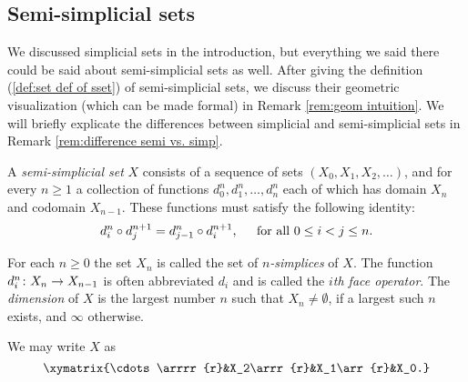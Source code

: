 \documentclass{amsart}
\begin{document}
\subsection{Semi-simplicial sets}\label{subsec:semi}

We discussed simplicial sets in the introduction, but everything we said there could be said about semi-simplicial sets as well.  After giving the definition (\ref{def:set def of sset}) of semi-simplicial sets, we discuss their geometric visualization (which can be made formal) in Remark \ref{rem:geom intuition}.  We will briefly explicate the differences between simplicial and semi-simplicial sets in Remark \ref{rem:difference semi vs. simp}.  

\begin{definition}\label{def:set def of sset}

A {\em semi-simplicial set} $X$ consists of a sequence of sets $(X_0,X_1,X_2,\ldots)$, and for every $n\geq 1$ a collection of functions $d^n_0,d^n_1,\ldots,d^n_n$ each of which has domain $X_n$ and codomain $X_{n-1}$.  These functions must satisfy the following identity: \begin{align}\label{dia:semi identity} d^n_i\circ d^{n+1}_j=d^n_{j-1}\circ d^{n+1}_i, \hspace{.2in} \textnormal{for all } 0\leq i<j\leq n.\end{align}  

For each $n\geq 0$ the set $X_n$ is called the set of {\em $n$-simplices} of $X$.  The function $d^n_i\colon X_n\rightarrow X_{n-1}$ is often abbreviated $d_i$ and is called the {\em $i$th face operator}.  The {\em dimension} of $X$ is the largest number $n$ such that $X_n\neq\emptyset$, if a largest such $n$ exists, and $\infty$ otherwise.

We may write $X$ as $$\xymatrix{\cdots \arrrr{r}&X_2\arrr{r}&X_1\arr{r}&X_0.}$$

\end{definition}
\end{document}
